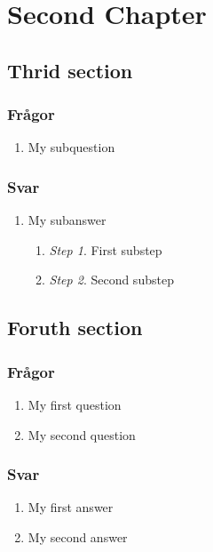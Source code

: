 \documentclass[11pt]{report}
\begin{document}
\chapter{Second Chapter}
\section{Thrid section}
\subsection{Frågor}
\begin{enumerate}
	\item My subquestion
	\end{enumerate}
\subsection{Svar}
\begin{enumerate}
	\item My subanswer \begin{enumerate}
		\item \emph{Step 1}. First substep
		\item \emph{Step 2}. Second substep
		\end{enumerate}
	\end{enumerate}

\section{Foruth section}
\subsection{Frågor}
\begin{enumerate}
	\item My first question
	\item My second question
\end{enumerate}
\subsection{Svar}
\begin{enumerate}
	\item My first answer
	\item My second answer
\end{enumerate}
\end{document}
